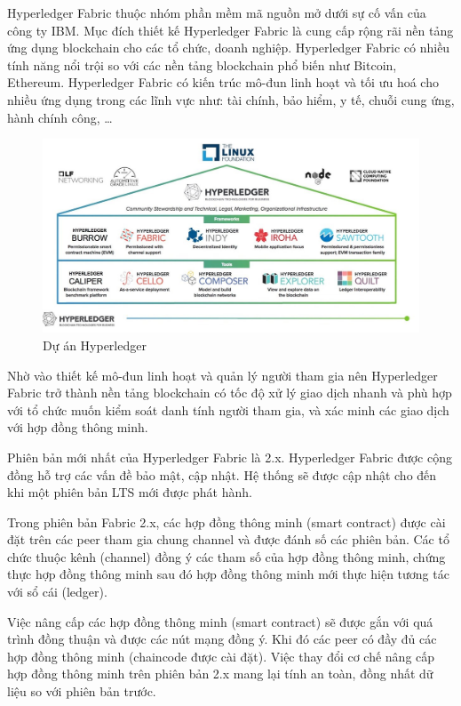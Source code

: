 Hyperledger Fabric thuộc nhóm phần mềm mã nguồn mở dưới sự cố vấn của công ty IBM. Mục đích thiết kế Hyperledger Fabric là cung cấp rộng rãi nền tảng ứng dụng blockchain cho các tổ chức, doanh nghiệp. Hyperledger Fabric có nhiều tính năng nổi trội so với các nền tảng blockchain phổ biến như Bitcoin, Ethereum. Hyperledger Fabric có kiến trúc mô-đun linh hoạt và tối ưu hoá cho nhiều ứng dụng trong các lĩnh vực như: tài chính, bảo hiểm, y tế, chuỗi cung ứng, hành chính công, \ldots{}

\begin{figure}[htbp]
\centering
\includegraphics[width=.9\linewidth]{img/hlf_um.jpg}
\caption{Dự án Hyperledger}
\label{fig:hlf_um}
\end{figure}

Nhờ vào thiết kế mô-đun linh hoạt và quản lý người tham gia nên Hyperledger Fabric trở thành nền tảng blockchain có tốc độ xử lý giao dịch nhanh và phù hợp với tổ chức muốn kiểm soát danh tính người tham gia, và xác minh các giao dịch với hợp đồng thông minh.

Phiên bản mới nhất của Hyperledger Fabric là 2.x. Hyperledger Fabric được cộng đồng hỗ trợ các vấn đề bảo mật, cập nhật. Hệ thống sẽ được cập nhật cho đến khi một phiên bản LTS mới được phát hành.


Trong phiên bản Fabric 2.x, các hợp đồng thông minh (smart contract) được cài đặt trên các peer tham gia chung channel và được đánh số các phiên bản. Các tổ chức thuộc kênh (channel) đồng ý các tham số của hợp đồng thông minh, chứng thực hợp đồng thông minh sau đó hợp đồng thông minh mới thực hiện tương tác với sổ cái (ledger).

Việc nâng cấp các hợp đồng thông minh (smart contract) sẽ được gắn với quá trình đồng thuận và được các nút mạng đồng ý. Khi đó các peer có đầy đủ các hợp đồng thông minh (chaincode được cài đặt). Việc thay đổi cơ chế nâng cấp hợp đồng thông minh trên phiên bản 2.x mang lại tính an toàn, đồng nhất dữ liệu so với phiên bản trước.

